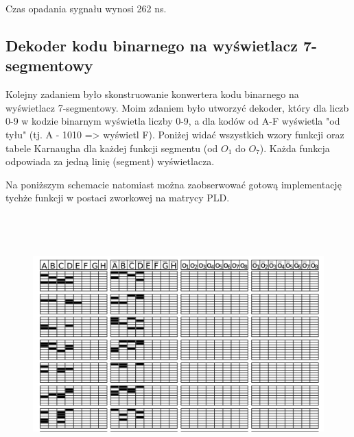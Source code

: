 \documentclass[a4paper,12pt]{article}
\begin{document}
\begin{justify}
Czas opadania sygnału wynosi 262 ns.

\subsection{Dekoder kodu binarnego na wyświetlacz 7-segmentowy}

Kolejny zadaniem było skonstruowanie konwertera kodu binarnego na wyświetlacz 7-segmentowy. Moim zdaniem było utworzyć dekoder, który dla liczb 0-9 w kodzie binarnym wyświetla liczby 0-9, a dla kodów od A-F wyświetla "od tyłu" (tj. A - 1010 => wyświetl F). Poniżej widać wszystkich wzory funkcji oraz tabele Karnaugha dla każdej funkcji segmentu (od $O_{1}$ do $O_{7}$). Każda funkcja odpowiada za jedną linię (segment) wyświetlacza. 

\newpage





\newpage

Na poniższym schemacie natomiast można zaobserwować gotową implementację tychże funkcji w postaci zworkowej na matrycy PLD.

\begin{figure}[h!]
\centering
\includegraphics[width=18cm, height=10cm]{Z_DEKODER}
\end{figure}

\end{justify}
\end{document}
